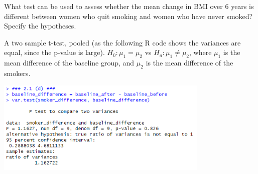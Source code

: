 What test can be used to assess whether the mean change in BMI over 6 years is
different between women who quit smoking and women who have never smoked? Specify
the hypotheses.

\soln* A two sample t-test, pooled (as the following R code shows the variances are equal, since the p-value is large). $H_0 : \mu_1 = \mu_2$ vs $H_a : \mu_1 \neq \mu_2$, where $\mu_1$ is the mean difference of the baseline group, and $\mu_2$ is the mean difference of the smokers.

\nl \includegraphics*[width=4in]{img/2_1d_console.PNG}